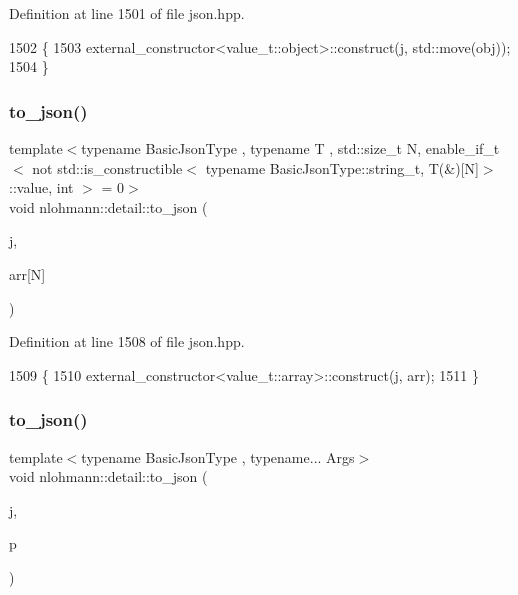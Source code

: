 Definition at line 1501 of file json.\+hpp.


\begin{DoxyCode}
1502 \{
1503     external\_constructor<value\_t::object>::construct(j, std::move(obj));
1504 \}
\end{DoxyCode}
\mbox{\label{namespacenlohmann_1_1detail_a8c4d301fc51996e3c5c1257fb92ace20}} 
\subsubsection{\texorpdfstring{to\+\_\+json()}{to\_json()}\hspace{0.1cm}{\footnotesize\ttfamily [14/16]}}
{\footnotesize\ttfamily template$<$typename Basic\+Json\+Type , typename T , std\+::size\+\_\+t N, enable\+\_\+if\+\_\+t$<$ not std\+::is\+\_\+constructible$<$ typename Basic\+Json\+Type\+::string\+\_\+t, T(\&)\mbox{[}\+N\mbox{]}$>$\+::value, int $>$  = 0$>$ \\
void nlohmann\+::detail\+::to\+\_\+json (\begin{DoxyParamCaption}\item[{Basic\+Json\+Type \&}]{j,  }\item[{T(\&)}]{arr\mbox{[}\+N\mbox{]} }\end{DoxyParamCaption})}



Definition at line 1508 of file json.\+hpp.


\begin{DoxyCode}
1509 \{
1510     external\_constructor<value\_t::array>::construct(j, arr);
1511 \}
\end{DoxyCode}
\mbox{\label{namespacenlohmann_1_1detail_aa30611f74062379d3420c40487cf3bb3}} 
\subsubsection{\texorpdfstring{to\+\_\+json()}{to\_json()}\hspace{0.1cm}{\footnotesize\ttfamily [15/16]}}
{\footnotesize\ttfamily template$<$typename Basic\+Json\+Type , typename... Args$>$ \\
void nlohmann\+::detail\+::to\+\_\+json (\begin{DoxyParamCaption}\item[{Basic\+Json\+Type \&}]{j,  }\item[{const std\+::pair$<$ Args... $>$ \&}]{p }\end{DoxyParamCaption})}



